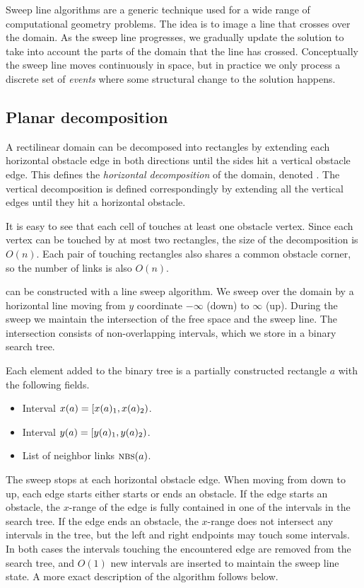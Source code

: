\documentclass[english,gradu]{tktltiki2018}
\begin{document}
Sweep line algorithms are a generic technique used for a wide range of computational geometry problems.
The idea is to image a line that crosses over the domain.
As the sweep line progresses, we gradually update the solution to take into account the parts of the domain that the line has crossed.
Conceptually the sweep line moves continuously in space, but in practice we only process a discrete set of \emph{events} where some structural change to the solution happens.


\subsection{Planar decomposition}\label{sec:decomp2d}

A rectilinear domain can be decomposed into rectangles by extending each horizontal obstacle edge in both directions until the sides hit a vertical obstacle edge.
This defines the \emph{horizontal decomposition} of the domain, denoted .
The vertical decomposition  is defined correspondingly by extending all the vertical edges until they hit a horizontal obstacle.

It is easy to see that each cell of  touches at least one obstacle vertex.
Since each vertex can be touched by at most two rectangles, the size of the decomposition is $O(n)$.
Each pair of touching rectangles also shares a common obstacle corner, so the number of links is also $O(n)$.

 can be constructed with a line sweep algorithm.
We sweep over the domain by a horizontal line moving from $y$ coordinate $-\infty$ (down) to $\infty$ (up).
During the sweep we maintain the intersection of the free space \fspace and the sweep line.
The intersection consists of non-overlapping intervals, which we store in a binary search tree.

Each element added to the binary tree is a partially constructed rectangle $a$ with the following fields.
\begin{itemize}
\item Interval $x(a)=\left [ x(a)_{1} , x(a)_{2} \right )$.
\item Interval $y(a)=\left [ y(a)_{1} , y(a)_{2} \right )$.
\item List of neighbor links $\textsc{nbs}{(a)}$.
\end{itemize}

The sweep stops at each horizontal obstacle edge.
When moving from down to up, each edge starts either starts or ends an obstacle.
If the edge starts an obstacle, the $x$-range of the edge is fully contained in one of the intervals in the search tree.
If the edge ends an obstacle, the $x$-range does not intersect any intervals in the tree, but the left and right endpoints may touch some intervals.
In both cases the intervals touching the encountered edge are removed from the search tree, and $O(1)$ new intervals are inserted to maintain the sweep line state.
A more exact description of the algorithm follows below.
\end{document}
